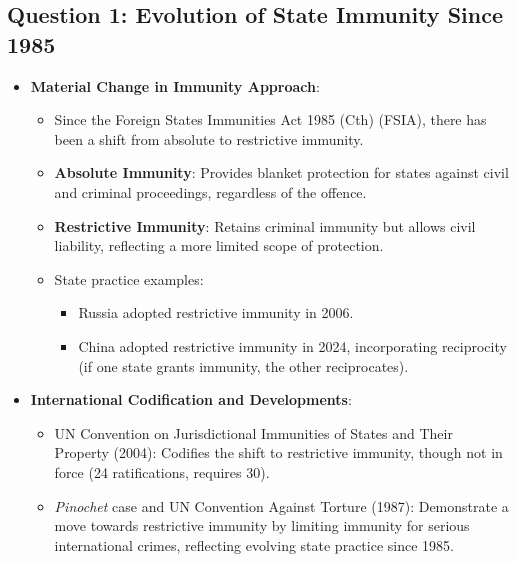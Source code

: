 \subsection{Question 1: Evolution of State Immunity Since 1985}
\begin{itemize}
    \item \textbf{Material Change in Immunity Approach}:
    \begin{itemize}
        \item Since the Foreign States Immunities Act 1985 (Cth) (FSIA), there has been a shift from absolute to restrictive immunity.
        \item \textbf{Absolute Immunity}: Provides blanket protection for states against civil and criminal proceedings, regardless of the offence.
        \item \textbf{Restrictive Immunity}: Retains criminal immunity but allows civil liability, reflecting a more limited scope of protection.
        \item State practice examples:
        \begin{itemize}
            \item Russia adopted restrictive immunity in 2006.
            \item China adopted restrictive immunity in 2024, incorporating reciprocity (if one state grants immunity, the other reciprocates).
        \end{itemize}
    \end{itemize}
    \item \textbf{International Codification and Developments}:
    \begin{itemize}
        \item UN Convention on Jurisdictional Immunities of States and Their Property (2004): Codifies the shift to restrictive immunity, though not in force (24 ratifications, requires 30).
        \item \textit{Pinochet} case and UN Convention Against Torture (1987): Demonstrate a move towards restrictive immunity by limiting immunity for serious international crimes, reflecting evolving state practice since 1985.
    \end{itemize}
\end{itemize}

